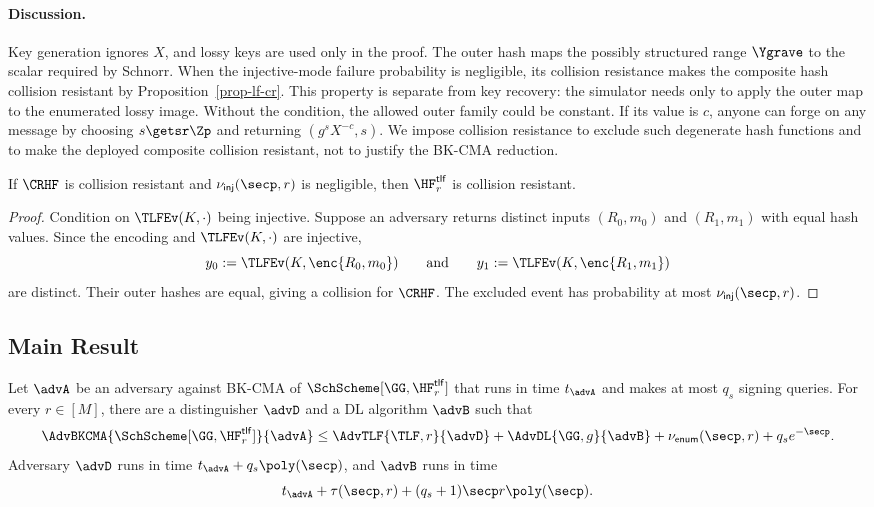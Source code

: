 \paragraph*{Discussion.} Key generation ignores $X$, and lossy keys are used only in the proof. The outer hash maps the possibly structured range $\Ygrave$ to the scalar required by Schnorr. When the injective-mode failure probability is negligible, its collision resistance makes the composite hash collision resistant by Proposition~\ref{prop-lf-cr}. This property is separate from key recovery: the simulator needs only to apply the outer map to the enumerated lossy image. Without the condition, the allowed outer family could be constant. If its value is $c$, anyone can forge on any message by choosing $s\getsr\Zp$ and returning $(g^sX^{-c},s)$. We impose collision resistance to exclude such degenerate hash functions and to make the deployed composite collision resistant, not to justify the BK-CMA reduction.

\begin{proposition} \label{prop-lf-cr}
If $\CRHF$ is collision resistant and $\nu_{\mathsf{inj}}(\secp,r)$ is negligible, then $\HF^{\mathsf{tlf}}_r$ is collision resistant.
\end{proposition}

\begin{proof}
Condition on $\TLFEv(K,\cdot)$ being injective. Suppose an adversary returns distinct inputs $(R_0,m_0)$ and $(R_1,m_1)$ with equal hash values. Since the encoding and $\TLFEv(K,\cdot)$ are injective,
$$
y_0:=\TLFEv(K,\enc{R_0,m_0})
\qquad\text{and}\qquad
y_1:=\TLFEv(K,\enc{R_1,m_1})
$$
are distinct. Their outer hashes are equal, giving a collision for $\CRHF$. The excluded event has probability at most $\nu_{\mathsf{inj}}(\secp,r)$.
\end{proof}

\subsection{Main Result} \label{sec-lf-thm}

\begin{theorem} \label{thm-bk}
Let $\advA$ be an adversary against BK-CMA of $\SchScheme[\GG,\HF^{\mathsf{tlf}}_r]$ that runs in time $t_{\advA}$ and makes at most $q_s$ signing queries. For every $r\in[M]$, there are a distinguisher $\advD$ and a DL algorithm $\advB$ such that
$$
\AdvBKCMA{\SchScheme[\GG,\HF^{\mathsf{tlf}}_r]}{\advA}
\le
\AdvTLF{\TLF,r}{\advD}
+\AdvDL{\GG,g}{\advB}
+\nu_{\mathsf{enum}}(\secp,r)
+q_s e^{-\secp}.
$$
Adversary $\advD$ runs in time $t_{\advA}+q_s\poly(\secp)$, and $\advB$ runs in time
$$
t_{\advA}+\tau(\secp,r)+(q_s+1)\secp r\poly(\secp).
$$
\end{theorem}

